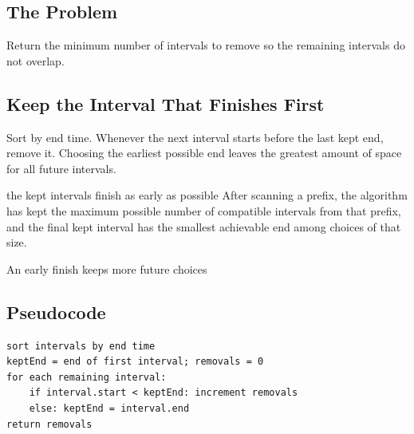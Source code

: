 

\subsection{The Problem}
Return the minimum number of intervals to remove so the remaining intervals
do not overlap.

\subsection{Keep the Interval That Finishes First}
Sort by end time. Whenever the next interval starts before the last kept end,
remove it. Choosing the earliest possible end leaves the greatest amount of
space for all future intervals.

\begin{invariantbox}{the kept intervals finish as early as possible}
After scanning a prefix, the algorithm has kept the maximum possible number
of compatible intervals from that prefix, and the final kept interval has the
smallest achievable end among choices of that size.
\end{invariantbox}

\begin{visualbox}{An early finish keeps more future choices}
\centering
{}
\end{visualbox}

\subsection{Pseudocode}
\begin{lstlisting}[style=pseudocode]
sort intervals by end time
keptEnd = end of first interval; removals = 0
for each remaining interval:
    if interval.start < keptEnd: increment removals
    else: keptEnd = interval.end
return removals
\end{lstlisting}


